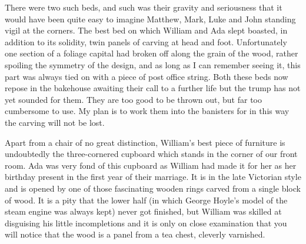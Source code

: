 There were two such beds, and such was their gravity and seriousness that it would have been quite easy to imagine Matthew, Mark, Luke and John standing vigil at the corners. The best bed on which William and Ada slept boasted, in addition to its solidity, twin panels of carving at head and foot. Unfortunately one section of a foliage capital had broken off along the grain of the wood, rather spoiling the symmetry of the design, and as long as I can remember seeing it, this part was always tied on with a piece of post office string. Both these beds now repose in the bakehouse awaiting their call to a further life but the trump has not yet sounded for them. They are too good to be thrown out, but far too cumbersome to use. My plan is to work them into the banisters for in this way the carving will not be lost.

Apart from a chair of no great distinction, William's best piece of furniture is undoubtedly the three-cornered cupboard which stands in the corner of our front room. Ada was very fond of this cupboard as William had made it for her as her birthday present in the first year of their marriage. It is in the late Victorian style and is opened by one of those fascinating wooden rings carved from a single block of wood. It is a pity that the lower half (in which George Hoyle's model of the steam engine was always kept) never got finished, but William was skilled at disguising his little incompletions and it is only on close examination that you will notice that the wood is a panel from a tea chest, cleverly varnished.
